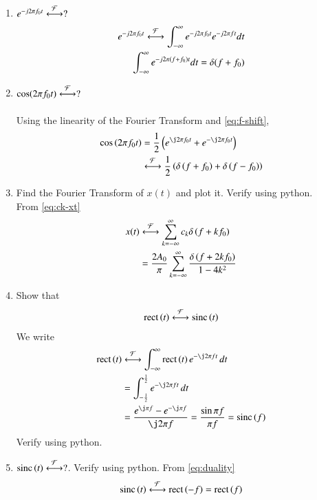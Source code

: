 \documentclass[journal,12pt,twocolumn]{IEEEtran}
\renewcommand\thesection{\arabic{section}}
\begin{document}
\begin{enumerate}[label=\thesection.\arabic*
,ref=\thesection.\theenumi]
\begin{align}
	= e^{\j 2\pi (0) t} = 1
	\label{eq:fourier-delta}
\end{align}
\item $e^{-j2\pi f_0t}\overset{\mathcal{F}}{ \longleftrightarrow}?$\\
\solution %
\begin{align}
	e^{-j2\pi f_0t}\overset{\mathcal{F}}{ \longleftrightarrow} \int_{-\infty}^{\infty} e^{-j2\pi f_0t} e^{-j2\pi ft}dt\\
	\int_{-\infty}^{\infty} e^{-j2\pi (f+f_0)t} dt
	=\delta(f+f_0)
	\label{eq:f-shift}
\end{align}
\item $\cos(2\pi f_0t)\overset{\mathcal{F}}{ \longleftrightarrow}?$\\
\solution\\
Using the linearity of the Fourier Transform and \eqref{eq:f-shift},
\begin{align}
	\cos\brak{2\pi f_0t} &= \frac{1}{2}
	\brak{e^{\j2\pi f_0t} + e^{-\j2\pi f_0t}} \nonumber \\ 
	&\system{F}\frac{1}{2}\brak{\delta\brak{f+f_0} + \delta\brak{f-f_0}}
\end{align}
 \item Find the Fourier Transform of $x(t)$ and plot it.  Verify using python.\\
 \solution From \eqref{eq:ck-xt}
\begin{align}
 x(t)&\overset{\mathcal{F}}{ \longleftrightarrow}\sum_{k=-\infty}^{\infty}c_k\delta\left(f+kf_0\right) \\
 &=\frac{2A_0}{\pi}\sum_{k=-\infty}^{\infty}\frac{\delta\left(f+2kf_0\right)}{1-4k^2}
 \label{eq:fourier-xt}
\end{align}
 \item Show that 
 \begin{align}
	 \text{rect}\left(t\right) \overset{\mathcal{F}}{ \longleftrightarrow} \text{sinc}\left(t\right)
 \end{align}
\solution We write
\begin{align}
	\rect{t}&\system{F}\int_{-\infty}^{\infty}\rect{t}e^{-\j2\pi ft}\, dt \\
	&=\int_{-\frac{1}{2}}^{\frac{1}{2}}e^{-\j2\pi ft}\, dt \\
	&=\frac{e^{\j\pi f} - e^{-\j\pi f}}{\j2\pi f} = \frac{\sin{\pi f}}{\pi f} = \sinc{f}
	\label{eq:fourier-rect}
\end{align}		
 Verify using python.
 \item 
$	 \text{sinc}\left(t\right)\overset{\mathcal{F}}{ \longleftrightarrow} ?$.  Verify using python.
\solution From \eqref{eq:duality}
\begin{align}
	\text{sinc}\left(t\right)\overset{\mathcal{F}}{ \longleftrightarrow}\text{rect}\left(-f\right)=\text{rect}\left(f\right)
	\label{eq:fourier-sinc}
\end{align}
\end{enumerate}
\end{document}
